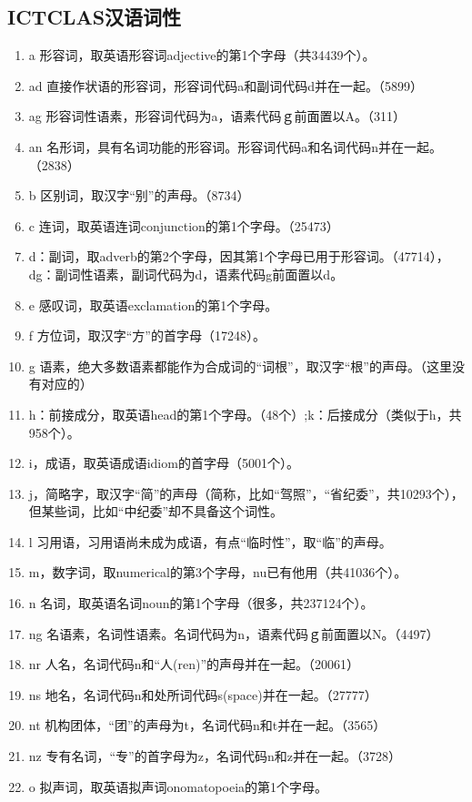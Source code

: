 \subsection{ICTCLAS汉语词性}
\begin{enumerate}[(1)]
\item a 形容词，取英语形容词adjective的第1个字母（共34439个）。
\item ad 直接作状语的形容词，形容词代码a和副词代码d并在一起。（5899）
\item ag 形容词性语素，形容词代码为a，语素代码ｇ前面置以A。（311）
\item an 名形词，具有名词功能的形容词。形容词代码a和名词代码n并在一起。（2838）
\item b 区别词，取汉字“别”的声母。（8734）
\item c 连词，取英语连词conjunction的第1个字母。（25473）
\item d：副词，取adverb的第2个字母，因其第1个字母已用于形容词。（47714），dg：副词性语素，副词代码为d，语素代码g前面置以d。
\item e 感叹词，取英语exclamation的第1个字母。
\item f 方位词，取汉字“方”的首字母（17248）。
\item g 语素，绝大多数语素都能作为合成词的“词根”，取汉字“根”的声母。（这里没有对应的）
\item h：前接成分，取英语head的第1个字母。（48个）;k：后接成分（类似于h，共958个）。
\item i，成语，取英语成语idiom的首字母（5001个）。
\item j，简略字，取汉字“简”的声母（简称，比如“驾照”，“省纪委”，共10293个），但某些词，比如“中纪委”却不具备这个词性。
\item l 习用语，习用语尚未成为成语，有点“临时性”，取“临”的声母。
\item m，数字词，取numerical的第3个字母，nu已有他用（共41036个）。
\item n 名词，取英语名词noun的第1个字母（很多，共237124个）。
\item ng 名语素，名词性语素。名词代码为n，语素代码ｇ前面置以N。（4497）
\item nr 人名，名词代码n和“人(ren)”的声母并在一起。（20061）
\item ns 地名，名词代码n和处所词代码s(space)并在一起。（27777）
\item nt 机构团体，“团”的声母为t，名词代码n和t并在一起。（3565）
\item nz 专有名词，“专”的首字母为z，名词代码n和z并在一起。（3728）
\item o 拟声词，取英语拟声词onomatopoeia的第1个字母。

\end{enumerate}
